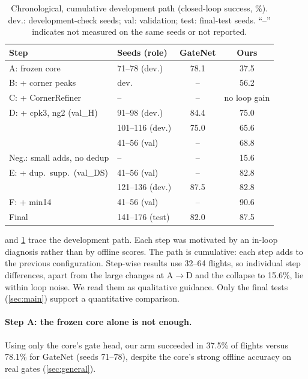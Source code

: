 \documentclass[10pt,twocolumn,letterpaper]{article}
\begin{document}
\begin{table}[t]
  \centering
  \small
  \setlength{\tabcolsep}{3pt}
  \begin{tabular}{@{}llcc@{}}
    \toprule
    Step & Seeds (role) & GateNet & Ours \\
    \midrule
    A: frozen core & 71--78 (dev.) & 78.1 & 37.5 \\
    B: + corner peaks & dev. & -- & 56.2 \\
    C: + CornerRefiner & -- & -- & no loop gain \\
    D: + cpk3, ng2 (val\_H) & 91--98 (dev.) & 84.4 & 75.0 \\
     & 101--116 (dev.) & 75.0 & 65.6 \\
     & 41--56 (val) & -- & 68.8 \\
    Neg.: small adds, no dedup & -- & -- & 15.6 \\
    E: + dup.\ supp.\ (val\_DS) & 41--56 (val) & -- & 82.8 \\
     & 121--136 (dev.) & 87.5 & 82.8 \\
    F: + min14 & 41--56 (val) & -- & 90.6 \\
    \midrule
    Final & 141--176 (test) & 82.0 & 87.5 \\
    \bottomrule
  \end{tabular}
  \caption{Chronological, cumulative development path (closed-loop success, \%). dev.: development-check seeds; val: validation; test: final-test seeds. ``--'' indicates not measured on the same seeds or not reported.}
  \label{tab:path}
\end{table}

 and \cref{tab:path} trace the development path. Each step was motivated by an in-loop diagnosis rather than by offline scores. The path is cumulative: each step adds to the previous configuration. Step-wise results use 32--64 flights, so individual step differences, apart from the large changes at A$\to$D and the collapse to 15.6\%, lie within loop noise. We read them as qualitative guidance. Only the final tests (\cref{sec:main}) support a quantitative comparison.

\paragraph{Step A: the frozen core alone is not enough.}
Using only the core's gate head, our arm succeeded in 37.5\% of flights versus 78.1\% for GateNet (seeds 71--78), despite the core's strong offline accuracy on real gates (\cref{sec:general}).
\end{document}
